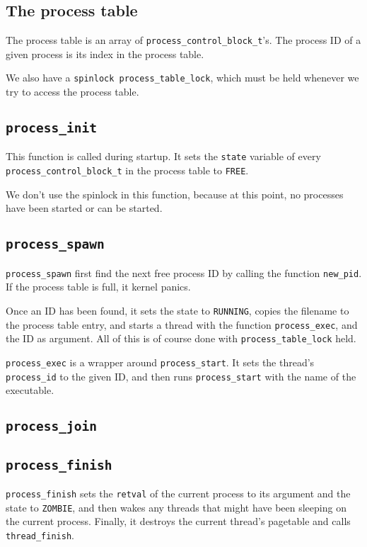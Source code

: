 \documentclass{article}
\begin{document}
\subsection{The process table}
The process table is an array of \texttt{process\_control\_block\_t}'s. The process ID of a given process is its index in the process table.

We also have a \texttt{spinlock process\_table\_lock}, which must be held whenever we try to access the process table.

\subsection{\texttt{process\_init}}
This function is called during startup. It sets the \texttt{state} variable of every \texttt{process\_control\_block\_t} in the process table to \texttt{FREE}.

We don't use the spinlock in this function, because at this point, no processes have been started or can be started.

\subsection{\texttt{process\_spawn}}
\texttt{process\_spawn} first find the next free process ID by calling the function \texttt{new\_pid}. If the process table is full, it kernel panics.

Once an ID has been found, it sets the state to \texttt{RUNNING}, copies the filename to the process table entry, and starts a thread with the function \texttt{process\_exec}, and the ID as argument. All of this is of course done with \texttt{process\_table\_lock} held.

\texttt{process\_exec} is a wrapper around \texttt{process\_start}. It sets the thread's \texttt{process\_id} to the given ID, and then runs \texttt{process\_start} with the name of the executable.

\subsection{\texttt{process\_join}}


\subsection{\texttt{process\_finish}}

\texttt{process\_finish} sets the \texttt{retval} of the current process to its argument and the state to \texttt{ZOMBIE}, and then wakes any threads that might have been sleeping on the current process. Finally, it destroys the current thread's pagetable and calls \texttt{thread\_finish}.
\end{document}
